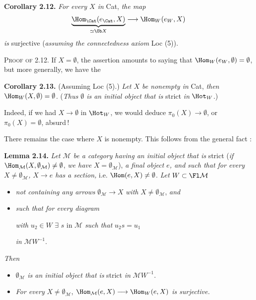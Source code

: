 \textbf{Corollary 2.12.} \textit{For every $X$ in} Cat, \textit{the map}
\[
\underbrace{\Hom_{\Cat}(e_{\Cat},X)}_{\simeq\Ob X}\longrightarrow\Hom_W(e_W,X)
\]
\textit{is} surjective (\textit{assuming the connectedness axiom} Loc (5)).

\textsc{Proof of} 2.12. If $X=\emptyset$, the assertion amounts to saying that $\Hom_W(e_W,\emptyset)=\emptyset$, but more generally, we have the

\textbf{Corollary 2.13.} (Assuming Loc (5).) \textit{Let $X$ be nonempty in} Cat, \textit{then} $\Hom_W(X,\emptyset)=\emptyset$. (\textit{Thus $\emptyset$ is an initial object that is} strict \textit{in} $\Hot_W$.)

Indeed, if we had $X\longrightarrow\emptyset$ in $\Hot_W$,
we would deduce $\pi_0(X)\longrightarrow\emptyset$, or $\pi_0(X)=\emptyset$, absurd\,!

There remains the case where $X$ is nonempty. This follows from the general fact :

\textbf{Lemma 2.14.} \textit{Let $\mathcal{M}$ be a category having an initial object that is} strict (\textit{if} $\Hom_{\mathcal{M}}(X,\emptyset_{\mathcal{M}})\neq\emptyset$, \textit{we have} $X=\emptyset_{\mathcal{M}}$), \textit{a final object $e$, and such that for every $X\neq\emptyset_{\mathcal{M}}$, $X\longrightarrow e$ has a section,} i.e. $\Hom(e,X)\neq\emptyset$. \textit{Let} $W\subset\Fl\mathcal{M}$
\begin{itemize}[leftmargin=3em,labelwidth=2.5em,align=right]
\item[1$^{\circ}$)] \textit{not containing any arrows} $\emptyset_{\mathcal{M}}\longrightarrow X$ \textit{with} $X\neq\emptyset_{\mathcal{M}}$, \textit{and}
\item[2\,$^{\circ}$)] \textit{such that for every diagram}
\textit{with} $u_2\in W$ $\exists$ $s$ in $\mathcal{M}$ \textit{such that} $u_2s=u_1$

\textit{in} $\mathcal{M}W^{-1}$.
\end{itemize}
\textit{Then}
\begin{itemize}[leftmargin=3em,labelwidth=2.5em,align=right]
\item[a)] $\emptyset_{\mathcal{M}}$ \textit{is an initial object that is} strict \textit{in} $\mathcal{M}W^{-1}$.
\item[b)] \textit{For every} $X\neq\emptyset_{\mathcal{M}}$, $\Hom_{\mathcal{M}}(e,X)\longrightarrow\Hom_W(e,X)$ \textit{is surjective.}
\end{itemize}

